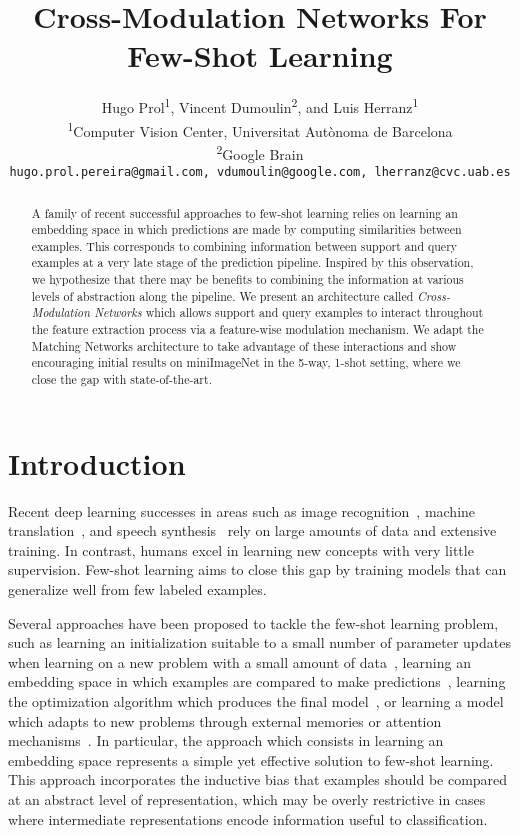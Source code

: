 \documentclass{article}
\title{Cross-Modulation Networks For Few-Shot Learning}
\author{
  Hugo Prol\textsuperscript{1}, Vincent Dumoulin\textsuperscript{2}, and
  Luis Herranz\textsuperscript{1} \\
  \textsuperscript{1}Computer Vision Center, Universitat Autònoma de Barcelona \\
  \textsuperscript{2}Google Brain \\
  \texttt{hugo.prol.pereira@gmail.com, vdumoulin@google.com, lherranz@cvc.uab.es}
}
\begin{document}

\maketitle

\begin{abstract}
  A family of recent successful approaches to few-shot learning relies
  on learning an embedding space in which predictions are made by
  computing similarities between examples. This corresponds to combining
  information between support and query examples at a very late
  stage of the prediction pipeline. Inspired by this observation, we
  hypothesize that there may be benefits to combining the information
  at various levels of abstraction along the pipeline. We present an
  architecture called \emph{Cross-Modulation Networks} which allows
  support and query examples to interact throughout the feature
  extraction process via a feature-wise modulation mechanism. We adapt the
  Matching Networks architecture to take advantage of these interactions
  and show encouraging initial results on miniImageNet in
  the 5-way, 1-shot setting, where we close the gap with state-of-the-art.
\end{abstract}

\section{Introduction}

Recent deep learning successes in areas such as image
recognition~\cite{simonyan14vgg,he2016resnet,hu17squeeze}, machine
translation~\cite{wu16googlemt,lample18phrase}, and speech
synthesis~\cite{oord2016wavenet} rely on large amounts of data and
extensive training. In contrast, humans excel in learning new concepts
with very little supervision. Few-shot learning aims to close this gap
by training models that can generalize well from few labeled examples.

Several approaches have been proposed to tackle the few-shot learning
problem, such as learning an initialization suitable to a small number
of parameter updates when learning on a new problem with a small
amount of
data~\cite{finn2017maml,nichol18reptile,kim2018bayesian,finn18platipus,grant18llama,rusu18leo},
learning an embedding space in which examples are compared to make
predictions~\cite{vinyals2016matching,snell2017proto,sung17relnet2,oreshkin18tadam},
learning the optimization algorithm which produces the final
model~\cite{ravi2017optim}, or learning a model which adapts to new
problems through external memories or attention
mechanisms~\cite{santoro2016meta,munkhdalai17condshift,shyam2017attentive,mishra2018simple}.
In particular, the approach which consists in learning an embedding
space represents a simple yet effective solution to few-shot learning.
This approach incorporates the inductive bias that examples should be
compared at an abstract level of representation, which may be overly
restrictive in cases where intermediate representations encode
information useful to classification.
\end{document}
